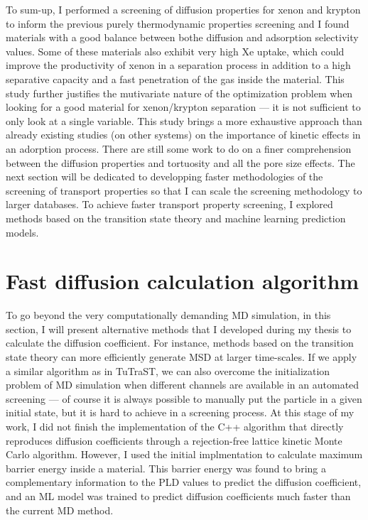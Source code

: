 \documentclass[main]{subfiles}
\begin{document}
To sum-up, I performed a screening of diffusion properties for xenon and krypton to inform the previous purely thermodynamic properties screening and I found materials with a good balance between bothe diffusion and adsorption selectivity values. Some of these materials also exhibit very high Xe uptake, which could improve the productivity of xenon in a separation process in addition to a high separative capacity and a fast penetration of the gas inside the material. This study further justifies the mutivariate nature of the optimization problem when looking for a good material for xenon/krypton separation --- it is not sufficient to only look at a single variable. This study brings a more exhaustive approach than already existing studies (on other systems) on the importance of kinetic effects in an adorption process.\autocite{Stanton_2022}
There are still some work to do on a finer comprehension between the diffusion properties and tortuosity and all the pore size effects. The next section will be dedicated to developping faster methodologies of the screening of transport properties so that I can scale the screening methodology to larger databases. To achieve faster transport property screening, I explored methods based on the transition state theory and machine learning prediction models.

\section{Fast diffusion calculation algorithm}\label{sct:algo_diff}

To go beyond the very computationally demanding MD simulation, in this section, I will present alternative methods that I developed during my thesis to calculate the diffusion coefficient. For instance, methods based on the transition state theory can more efficiently generate MSD at larger time-scales. If we apply a similar algorithm as in TuTraST, we can also overcome the initialization problem of MD simulation when different channels are available in an automated screening --- of course it is always possible to manually put the particle in a given initial state, but it is hard to achieve in a screening process. At this stage of my work, I did not finish the implementation of the C++ algorithm that directly reproduces diffusion coefficients through a rejection-free lattice kinetic Monte Carlo algorithm. However, I used the initial implmentation to calculate maximum barrier energy inside a material. This barrier energy was found to bring a complementary information to the PLD values to predict the diffusion coefficient, and an ML model was trained to predict diffusion coefficients much faster than the current MD method.
\end{document}
